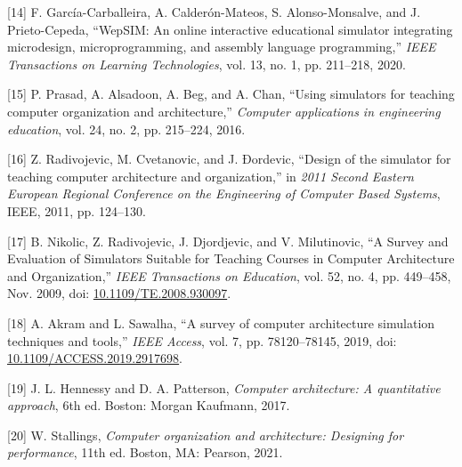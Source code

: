 \documentclass[12pt,oneside]{templates/unerthesis}
\newcommand{\CSLLeftMargin}[1]{#1} %
\newcommand{\CSLRightInline}[1]{#1} %
\newlength{\cslhangindent}
\newenvironment{CSLReferences}[2] %
 {\setlength{\parindent}{0pt}%
  \setlength{\leftskip}{#1 pt\relax}%
  \setlength{\parskip}{#2 pt\relax}%
  \everypar{\setlength{\hangindent}{\cslhangindent}}}
 {\par}
\begin{document}
\begin{CSLReferences}{0}{0}
\leavevmode{}%
\CSLLeftMargin{{[}14{]} }%
\CSLRightInline{F. García-Carballeira, A. Calderón-Mateos, S. Alonso-Monsalve, and J. Prieto-Cepeda, {``WepSIM: An online interactive educational simulator integrating microdesign, microprogramming, and assembly language programming,''} \emph{IEEE Transactions on Learning Technologies}, vol. 13, no. 1, pp. 211--218, 2020.}

\leavevmode{}%
\CSLLeftMargin{{[}15{]} }%
\CSLRightInline{P. Prasad, A. Alsadoon, A. Beg, and A. Chan, {``Using simulators for teaching computer organization and architecture,''} \emph{Computer applications in engineering education}, vol. 24, no. 2, pp. 215--224, 2016.}

\leavevmode{}%
\CSLLeftMargin{{[}16{]} }%
\CSLRightInline{Z. Radivojevic, M. Cvetanovic, and J. Ðordevic, {``Design of the simulator for teaching computer architecture and organization,''} in \emph{2011 {Second} {Eastern} {European} {Regional} {Conference} on the {Engineering} of {Computer} {Based} {Systems}}, IEEE, 2011, pp. 124--130.}

\leavevmode{}%
\CSLLeftMargin{{[}17{]} }%
\CSLRightInline{B. Nikolic, Z. Radivojevic, J. Djordjevic, and V. Milutinovic, {``A {Survey} and {Evaluation} of {Simulators} {Suitable} for {Teaching} {Courses} in {Computer} {Architecture} and {Organization},''} \emph{IEEE Transactions on Education}, vol. 52, no. 4, pp. 449--458, Nov. 2009, doi: \href{https://doi.org/10.1109/TE.2008.930097}{10.1109/TE.2008.930097}.}

\leavevmode{}%
\CSLLeftMargin{{[}18{]} }%
\CSLRightInline{A. Akram and L. Sawalha, {``A survey of computer architecture simulation techniques and tools,''} \emph{IEEE Access}, vol. 7, pp. 78120--78145, 2019, doi: \href{https://doi.org/10.1109/ACCESS.2019.2917698}{10.1109/ACCESS.2019.2917698}.}

\leavevmode{}%
\CSLLeftMargin{{[}19{]} }%
\CSLRightInline{J. L. Hennessy and D. A. Patterson, \emph{Computer architecture: A quantitative approach}, 6th ed. Boston: Morgan Kaufmann, 2017.}

\leavevmode{}%
\CSLLeftMargin{{[}20{]} }%
\CSLRightInline{W. Stallings, \emph{Computer organization and architecture: Designing for performance}, 11th ed. Boston, MA: Pearson, 2021.}


\end{CSLReferences}
\end{document}
